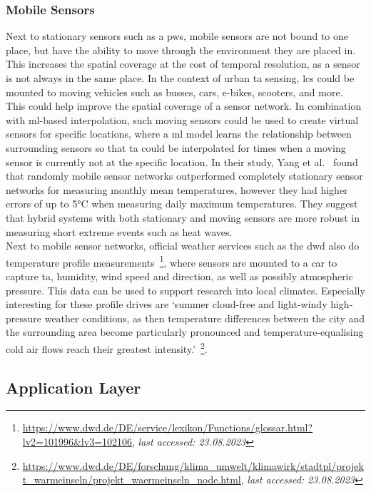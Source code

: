 \subsubsection{Mobile Sensors}

Next to stationary sensors such as a \gls{pws}, mobile sensors are not bound to one place, but have the ability to move through the environment they are placed in. This increases the spatial coverage at the cost of temporal resolution, as a sensor is not always in the same place. In the context of urban \gls{ta} sensing, \gls{lcs} could be mounted to moving vehicles such as busses, cars, e-bikes, scooters, and more. This could help improve the spatial coverage of a sensor network. In combination with \gls{ml}-based interpolation, such moving sensors could be used to create virtual sensors for specific locations, where a \gls{ml} model learns the relationship between surrounding sensors so that \gls{ta} could be interpolated for times when a moving sensor is currently not at the specific location. In their study, Yang et al.~\cite{yang2019designing} found that randomly mobile sensor networks outperformed completely stationary sensor networks for measuring monthly mean temperatures, however they had higher errors of up to 5°C when measuring daily maximum temperatures. They suggest that hybrid systems with both stationary and moving sensors are more robust in measuring short extreme events such as heat waves.\\
Next to mobile sensor networks, official weather services such as the \gls{dwd} also do temperature profile measurements~\footnote{\url{https://www.dwd.de/DE/service/lexikon/Functions/glossar.html?lv2=101996&lv3=102106}, \textit{last accessed: 23.08.2023}}, where sensors are mounted to a car to capture \gls{ta}, humidity, wind speed and direction, as well as possibly atmospheric pressure. This data can be used to support research into local climates. Especially interesting for these profile drives are `summer cloud-free and light-windy high-pressure weather conditions, as then temperature differences between the city and the surrounding area become particularly pronounced and temperature-equalising cold air flows reach their greatest intensity.'~\footnote{\url{https://www.dwd.de/DE/forschung/klima\_umwelt/klimawirk/stadtpl/projekt\_warmeinseln/projekt\_waermeinseln\_node.html}, \textit{last accessed: 23.08.2023}}.

\subsection{Application Layer}

